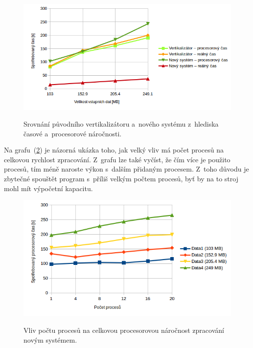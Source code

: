 \begin{figure}[H]
    \begin{center}
        \label{graph:graph_vertikalizator_vs_ja}
        \includegraphics[width=1.0\textwidth]{obrazky-figures/graph_vertikalizator_vs_ja.png}
        \caption{Srovnání původního vertikalizátoru a~nového systému z~hlediska časové a~procesorové náročnosti.}
    \end{center}
\end{figure}

Na grafu~(\ref{graph:graph_realny_cas_vertikalizace}) je názorná ukázka toho, jak velký vliv má počet
procesů na celkovou rychlost zpracování. Z~grafu lze také vyčíst, že čím více je použito procesů,
tím méně naroste výkon s~dalším přidaným procesem. Z~toho důvodu je zbytečné spouštět
program s~příliš velkým počtem procesů, byť by na to stroj mohl mít výpočetní kapacitu.

\begin{figure}[H]
    \begin{center}
        \label{graph:graph_realny_cas_vertikalizace}
        \includegraphics[width=1.0\textwidth]{obrazky-figures/graph_procesorovy_cas_vertikalizace.png}
        \caption{Vliv počtu procesů na celkovou procesorovou náročnost zpracování novým systémem.}
    \end{center}
\end{figure}

